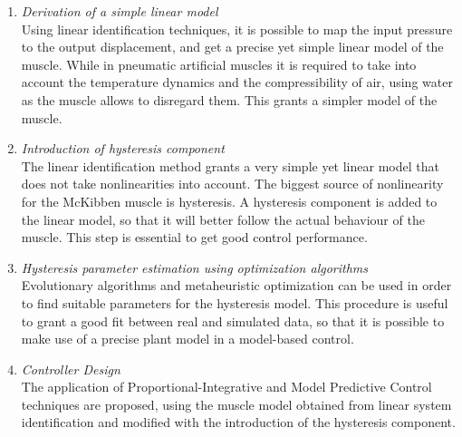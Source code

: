 \begin{enumerate}
	\item \textit{Derivation of a simple linear model} \smallskip \\ 
	Using linear identification techniques, it is possible to map the input pressure to the output displacement,
	and get a precise yet simple linear model of the muscle.
	While in pneumatic artificial muscles it is required to take into account
	the temperature dynamics and the compressibility of air, using water as the muscle
	allows to disregard them. This grants a simpler model of the muscle.
	
	\item \textit{Introduction of hysteresis component} \smallskip \\ 
	The linear identification method grants a very simple yet linear model
	that does not take nonlinearities into account. 
	The biggest source of nonlinearity for the McKibben muscle is hysteresis.
	A hysteresis component is added to the linear model, 
	so that it will	better follow the actual behaviour of the muscle.
	This step is essential to get good control performance.
	
	\item \textit{Hysteresis parameter estimation using optimization algorithms}\smallskip \\
	Evolutionary algorithms and metaheuristic optimization can be used in order
	to find suitable parameters for the hysteresis model. 
	This procedure is useful to grant a good fit between real and simulated data,
	so that it is possible to make use of a precise plant model in a model-based control.
	
	\item \textit{Controller Design} \smallskip \\
	The application of Proportional-Integrative and Model Predictive Control
	techniques are proposed, using the muscle model obtained from
	linear system identification and modified with the introduction
	of the hysteresis component.
	
\end{enumerate}









